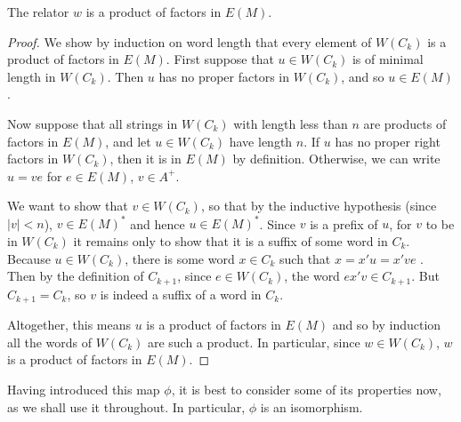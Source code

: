 \documentclass[noindex,noinsetproof,12pt]{lmaths}
\begin{document}
\begin{prop} \label{lma:relator-factors-E(M)}
	The relator $w$ is a product of factors in $E(M)$.
\end{prop}
\begin{proof}
	\hspace{-0.25mm}We show by induction on word length that every element of $W(C_k)$ is a product of factors in $E(M)$. First suppose that $u \in W(C_k)$ is of minimal length in $W(C_k)$. Then $u$ has no proper factors in $W(C_k)$, and so $u \in E(M)$.

	Now suppose that all strings in $W(C_k)$ with length less than $n$ are products of factors in $E(M)$, and let $u \in W(C_k)$ have length $n$. If $u$ has no proper right factors in $W(C_k)$, then it is in $E(M)$ by definition. Otherwise, we can write $u = ve$ for $e \in E(M)$, $v \in A^+$.

	We want to show that $v \in W(C_k)$, so that by the inductive hypothesis (since $|v| < n$), $v \in E(M)^*$ and hence $u \in E(M)^*$. Since $v$ is a prefix of $u$, for $v$ to be in $W(C_k)$ it remains only to show that it is a suffix of some word in $C_k$. Because $u \in W(C_k)$, there is some word $x \in C_k$ such that $x = x'u = x've$ . Then by the definition of $C_{k+1}$, since $e \in W(C_k)$, the word $ex'v \in C_{k+1}$. But $C_{k+1} = C_k$, so $v$ is indeed a suffix of a word in $C_k$.

	Altogether, this means $u$ is a product of factors in $E(M)$ and so by induction all the words of $W(C_k)$ are such a product. In particular, since $w \in W(C_k)$, $w$ is a product of factors in $E(M)$.
\end{proof}

Having introduced this map $\phi$, it is best to consider some of its properties now, as we shall use it throughout. In particular, $\phi$ is an isomorphism.
\end{document}
